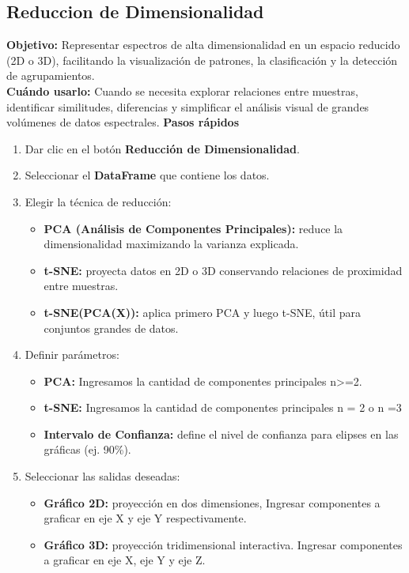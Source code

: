 \documentclass[12pt]{article}
\begin{document}
  
    \subsection{Reduccion de Dimensionalidad}
    \textbf{Objetivo:} Representar espectros de alta dimensionalidad en un espacio reducido (2D o 3D), facilitando la visualización de patrones, la clasificación y la detección de agrupamientos.\\
    \textbf{Cuándo usarlo:} Cuando se necesita explorar relaciones entre muestras, identificar similitudes, diferencias y simplificar el análisis visual de grandes volúmenes de datos espectrales.
    \textbf{Pasos rápidos}
    \begin{enumerate}
      \item Dar clic en el botón \textbf{Reducción de Dimensionalidad}.
      \item Seleccionar el \textbf{DataFrame} que contiene los datos.
      \item Elegir la técnica de reducción:
            \begin{itemize}
                \item  \textbf{PCA (Análisis de Componentes Principales):} reduce la dimensionalidad maximizando la varianza explicada.
                \item  \textbf{t-SNE:} proyecta datos en 2D o 3D conservando relaciones de proximidad entre muestras.
                \item \textbf{t-SNE(PCA(X)):} aplica primero PCA y luego t-SNE, útil para conjuntos grandes de datos.
            \end{itemize}
    \item Definir parámetros:
    \begin{itemize}
      \item \textbf{PCA:} Ingresamos la cantidad de componentes principales n>=2.
      \item \textbf{t-SNE:} Ingresamos la cantidad de componentes principales n = 2 o n =3
      \item \textbf{Intervalo de Confianza:} define el nivel de confianza para elipses en las gráficas (ej. 90\%).
    \end{itemize}
  \item Seleccionar las salidas deseadas:
    \begin{itemize}
      \item \textbf{Gráfico 2D:} proyección en dos dimensiones, Ingresar componentes a graficar en eje X y eje Y respectivamente.
      \item \textbf{Gráfico 3D:} proyección tridimensional interactiva. Ingresar componentes a graficar en eje X, eje Y y eje Z.

\end{itemize}
\end{enumerate}
\end{document}
